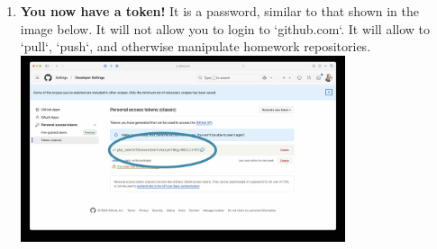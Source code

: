 \documentclass{article} %
\begin{document}
\begin{enumerate}
    \item \textbf{You now have a token!}  It is a password, similar to that shown in the image below.  It will not allow you to login to `github.com`.  It will allow to `pull`, `push`, and otherwise manipulate homework repositories.\\
    \includegraphics[width=0.75\textwidth]{figs/7password.jpg}
    
\end{enumerate}
\end{document}
